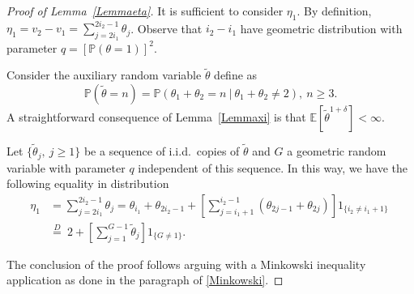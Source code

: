 \documentclass[a4paper,oneside,12pt]{amsart}
\renewcommand{\leq}{\leqslant}
\renewcommand{\geq}{\geqslant}
\newcommand{\E}{\mathbb{E}}
\theoremstyle{plain}
\theoremstyle{definition}
\theoremstyle{remark}
\renewcommand{\P}{\mathbb{P}}
\begin{document}
\begin{proof}[Proof of Lemma~\ref{Lemmaeta}]
It is sufficient to consider $\eta_1$. By definition, $\eta_1 = v_2 - v_1 = \sum_{j=2i_1}^{2i_2 - 1} \theta_j$. Observe that $i_2 - i_1$ have geometric distribution with parameter $q = [\P(\theta=1)]^2$.

Consider the auxiliary random variable $\tilde{\theta}$ define as
\[\P(\tilde{\theta} = n) =  \P(\theta_1 + \theta_2 = n ~\vert~ \theta_1 + \theta_2 \neq 2), ~n \geq 3.\]
A straightforward consequence of Lemma~\ref{Lemmaxi} is that $\E[\tilde{\theta}^{1+\delta}] < \infty.$  

Let $\{\tilde{\theta}_j, ~j \geq 1\}$ be a sequence of i.i.d.\ copies of $\tilde{\theta}$ and $G$ a geometric random variable with parameter $q$ independent of this sequence. In this way, we have the following equality in distribution
\begin{equation*}%
\begin{split}
\eta_1 &= \sum_{j=2i_1}^{2i_2 - 1} \theta_j = \theta_{i_1} + \theta_{2i_2 - 1} + \left[\sum_{j = i_1+1}^{i_2 - 1} (\theta_{2j-1} + \theta_{2j})\right]1_{\{i_2 \neq i_1 +1\}}~ \\ &\overset{D}{=} ~   2 + \left[\sum_{j = 1}^{G - 1}  \tilde{\theta}_j \right] 1_{\{G \neq 1\}}.
\end{split}
\end{equation*}

The conclusion of the proof follows arguing with a Minkowski inequality application as done in the paragraph of \eqref{Minkowski}. 

\end{proof}  
\end{document}
